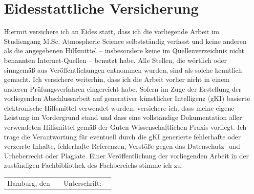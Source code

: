 \chapter*{Eidesstattliche Versicherung}

Hiermit versichere ich an Eides statt, dass ich die vorliegende Arbeit im Studiengang M.Sc. Atmospheric Science
selbstständig verfasst und keine anderen als die angegebenen Hilfsmittel – insbesondere
keine im Quellenverzeichnis nicht benannten Internet-Quellen – benutzt habe. Alle Stellen,
die wörtlich oder sinngemäß aus Veröffentlichungen entnommen wurden, sind als solche
kenntlich gemacht. Ich versichere weiterhin, dass ich die Arbeit vorher nicht in einem anderen
Prüfungsverfahren eingereicht habe.
Sofern im Zuge der Erstellung der vorliegenden Abschlussarbeit auf generativer künstlicher
Intelligenz (gKI) basierte elektronische Hilfsmittel verwendet wurden, versichere ich, dass
meine eigene Leistung im Vordergrund stand und dass eine vollständige Dokumentation aller
verwendeten Hilfsmittel gemäß der Guten Wissenschaftlichen Praxis vorliegt. Ich trage die
Verantwortung für eventuell durch die gKI generierte fehlerhafte oder verzerrte Inhalte,
fehlerhafte Referenzen, Verstöße gegen das Datenschutz- und Urheberrecht oder Plagiate.
\noindent
Einer Veröffentlichung der vorliegenden Arbeit in der zuständigen Fachbibliothek des Fachbereichs stimme ich zu.\newline


\vspace{25mm}

\noindent
\begin{tabular}{@{}p{2.5cm}p{3cm}p{2cm}p{7cm}}
Hamburg, den  & \hrulefill & Unterschrift: & \hrulefill \\
\end{tabular}


  



